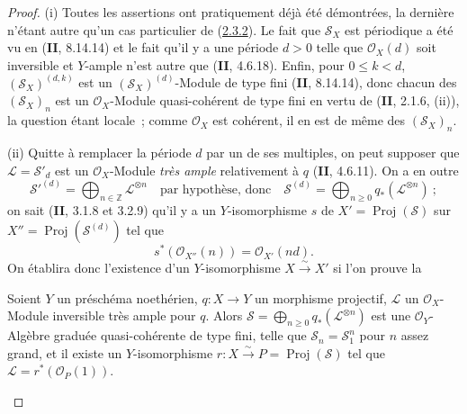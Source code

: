 \begin{proof}
(i) Toutes les assertions ont pratiquement déjà été démontrées, la
dernière n'étant autre qu'un cas particulier de
(\hyperref[III.2.3.2-fr]{2.3.2}). Le fait que $\mathcal S_X$ est
périodique a été vu en (\textbf{II}, 8.14.14) et le fait qu'il y a une période
$d>0$ telle que $\mathcal O_X(d)$ soit inversible et $Y$-ample n'est
autre que (\textbf{II}, 4.6.18). Enfin, pour $0\leq k<d$,
$(\mathcal S_X)^{(d,k)}$ est un $(\mathcal S_X)^{(d)}$-Module de type fini
(\textbf{II}, 8.14.14), donc chacun des $(\mathcal S_X)_n$ est un
$\mathcal O_X$-Module quasi-cohérent de type fini en vertu de
(\textbf{II}, 2.1.6, (ii)), la question étant locale~; comme $\mathcal O_X$ est
cohérent, il en est de même des $(\mathcal S_X)_n$.

(ii) Quitte à remplacer la période $d$ par un de ses multiples, on peut
supposer que $\mathcal L=\mathcal S'_d$ est un $\mathcal O_X$-Module
\emph{très ample} relativement à $q$ (\textbf{II}, 4.6.11). On a en outre
\[
\mathcal S'^{(d)}=\bigoplus_{n\in\mathbb Z}\mathcal L^{\otimes n}
\quad\text{par hypothèse, donc}\quad
\mathcal S^{(d)}=\bigoplus_{n\geq0}q_*(\mathcal L^{\otimes n})~;
\]
on sait (\textbf{II}, 3.1.8 et 3.2.9) qu'il y a un $Y$-isomorphisme $s$ de
$X'=\operatorname{Proj}(\mathcal S)$ sur
$X''=\operatorname{Proj}(\mathcal S^{(d)})$ tel que
\[
s^*(\mathcal O_{X''}(n))=\mathcal O_{X'}(nd).
\]
On établira donc l'existence d'un $Y$-isomorphisme $X\xrightarrow{\sim}X'$
si l'on prouve la

\begin{proposition}[2.3.4.1]
\label{III.2.3.4.1-fr}
Soient $Y$ un préschéma noethérien, $q:X\to Y$ un morphisme projectif,
$\mathcal L$ un $\mathcal O_X$-Module inversible très ample pour $q$.
Alors $\mathcal S=\bigoplus_{n\geq0}q_*(\mathcal L^{\otimes n})$ est une
$\mathcal O_Y$-Algèbre graduée quasi-cohérente de type fini, telle que
$\mathcal S_n=\mathcal S_1^n$ pour $n$ assez grand, et il existe un
$Y$-isomorphisme $r:X\xrightarrow{\sim}P=\operatorname{Proj}(\mathcal S)$
tel que $\mathcal L=r^*(\mathcal O_P(1))$.
\end{proposition}


\end{proof}
